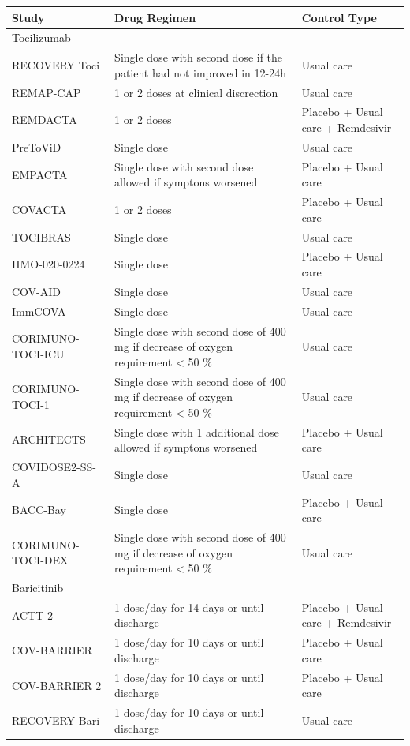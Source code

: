 \documentclass[
  12pt,
]{article}
\begin{document}
\begin{landscape}
\captionsetup[table]{labelformat=empty,skip=1pt}
\begin{longtable}{lll}
\toprule
Study & Drug Regimen & Control Type \\ 
\midrule
\multicolumn{1}{l}{Tocilizumab} \\ 
\midrule
RECOVERY Toci & Single dose with second dose if the patient had not improved in 12-24h & Usual care \\ 
REMAP-CAP & 1 or 2 doses at clinical discrection & Usual care \\ 
REMDACTA & 1 or 2 doses & Placebo + Usual care + Remdesivir \\ 
PreToViD & Single dose & Usual care \\ 
EMPACTA & Single dose with second dose allowed if symptons worsened & Placebo + Usual care \\ 
COVACTA & 1 or 2 doses & Placebo + Usual care \\ 
TOCIBRAS & Single dose & Usual care \\ 
HMO-020-0224 & Single dose & Placebo + Usual care \\ 
COV-AID & Single dose & Usual care \\ 
ImmCOVA & Single dose & Usual care \\ 
CORIMUNO-TOCI-ICU & Single dose with second dose of 400 mg if decrease of oxygen requirement < 50 \% & Usual care \\ 
CORIMUNO-TOCI-1 & Single dose with second dose of 400 mg if decrease of oxygen requirement < 50 \% & Usual care \\ 
ARCHITECTS & Single dose with 1 additional dose allowed if symptons worsened & Placebo + Usual care \\ 
COVIDOSE2-SS-A & Single dose & Usual care \\ 
BACC-Bay & Single dose & Placebo + Usual care \\ 
CORIMUNO-TOCI-DEX & Single dose with second dose of 400 mg if decrease of oxygen requirement < 50 \% & Usual care \\ 
\midrule
\multicolumn{1}{l}{Baricitinib} \\ 
\midrule
ACTT-2 & 1 dose/day for 14 days or until discharge & Placebo + Usual care + Remdesivir \\ 
COV-BARRIER & 1 dose/day for 10 days or until discharge & Placebo + Usual care \\ 
COV-BARRIER 2 & 1 dose/day for 10 days or until discharge & Placebo + Usual care \\ 
RECOVERY Bari & 1 dose/day for 10 days or until discharge & Usual care \\ 

\end{longtable}
\end{landscape}
\end{document}
